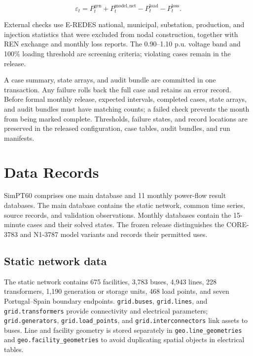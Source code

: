 \documentclass[
  10pt]{article}
\begin{document}
\[
\varepsilon_t=P_t^{\mathrm{gen}}+P_t^{\mathrm{model,net}}-P_t^{\mathrm{load}}-P_t^{\mathrm{loss}}. \tag{7}\label{eq:power-balance}
\]

External checks use E-REDES national, municipal, substation, production,
and injection statistics that were excluded from nodal construction,
together with REN exchange and monthly loss reports. The 0.90--1.10 p.u.
voltage band and 100\% loading threshold are screening criteria;
violating cases remain in the release.

A case summary, state arrays, and audit bundle are committed in one
transaction. Any failure rolls back the full case and retains an error
record. Before formal monthly release, expected intervals, completed
cases, state arrays, and audit bundles must have matching counts; a
failed check prevents the month from being marked complete. Thresholds,
failure states, and record locations are preserved in the released
configuration, case tables, audit bundles, and run manifests.

\section{Data Records}\label{data-records}

SimPT60 comprises one main database and 11 monthly power-flow result
databases. The main database contains the static network, common time
series, source records, and validation observations. Monthly databases
contain the 15-minute cases and their solved states. The frozen release
distinguishes the CORE-3783 and N1-3787 model variants and records their
permitted uses.

\subsection{Static network data}\label{static-network-data}

The static network contains 675 facilities, 3,783 buses, 4,943 lines,
228 transformers, 1,190 generation or storage units, 468 load points,
and seven Portugal--Spain boundary endpoints. \texttt{grid.buses},
\texttt{grid.lines}, and \texttt{grid.transformers} provide connectivity
and electrical parameters; \texttt{grid.generators},
\texttt{grid.load\_points}, and \texttt{grid.interconnectors} link
assets to buses. Line and facility geometry is stored separately in
\texttt{geo.line\_geometries} and \texttt{geo.facility\_geometries} to
avoid duplicating spatial objects in electrical tables.
\end{document}

